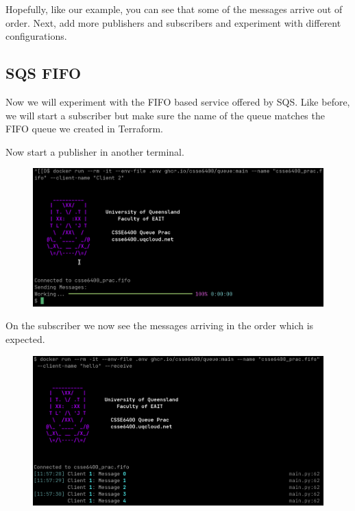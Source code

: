 \documentclass{csse4400}
\begin{document}
Hopefully, like our example, you can see that some of the messages arrive out of order.
Next, add more publishers and subscribers and experiment with different configurations.



\subsection{SQS FIFO}
Now we will experiment with the FIFO based service offered by SQS.
Like before, we will start a subscriber but make sure the name of the queue matches the FIFO queue we created in Terraform.


Now start a publisher in another terminal.


\begin{figure}[H]
  \includegraphics[width=\textwidth]{images/fifopub}
\end{figure}

On the subscriber we now see the messages arriving in the order which is expected.

\begin{figure}[H]
  \includegraphics[width=\textwidth]{images/fifosub}
\end{figure}
\end{document}
